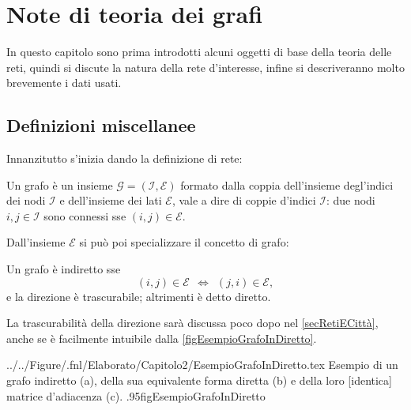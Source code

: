 

\chapter{Note di teoria dei grafi}\label{secTeoriaGrafi}

  In questo capitolo sono prima introdotti alcuni oggetti di base della teoria delle reti, quindi si discute la natura della rete d'interesse, infine si descriveranno molto brevemente i dati usati.

  \section{Definizioni miscellanee}\label{secDefinizioniGrafi}

    Innanzitutto s'inizia dando la definizione di rete:
    
    \begin{dfn}[Grafo]
      \label{defGrafo}
      Un grafo è un insieme \(\mathcal G=(\mathcal I,\mathcal E)\) formato dalla coppia dell'insieme degl'indici dei nodi \(\mathcal I\) e dell'insieme dei lati \(\mathcal E\), vale a dire di coppie d'indici \(\mathcal I\): due nodi \(i,j\in\mathcal I\) sono connessi sse \((i,j)\in\mathcal E\).
    \end{dfn}
    
    Dall'insieme \(\mathcal E\) si può poi specializzare il concetto di grafo:
    
    \begin{dfn}
      \label{defGrafoInDiretto}
      Un grafo è indiretto sse \[%
        (i,j)\in\mathcal E\ \ \iff\ \ (j,i)\in\mathcal E, %
      \] e la direzione è trascurabile; altrimenti è detto diretto.
    \end{dfn}
    
    La trascurabilità della direzione sarà discussa poco dopo nel \cref{secRetiECittà}, anche se è facilmente intuibile dalla \cref{figEsempioGrafoInDiretto}.

      {../../Figure/.fnl/Elaborato/Capitolo2/EsempioGrafoInDiretto.tex}
      {Esempio di un grafo indiretto (a), della sua equivalente forma diretta (b) e della loro [identica] matrice d'adiacenza (c).}
      {.95\linewidth}{figEsempioGrafoInDiretto}
    
